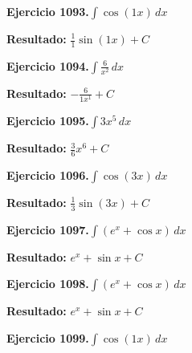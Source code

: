\documentclass[10pt,a4paper]{article}
\begin{document}
\newpage
\begin{ejbox}
\textbf{Ejercicio 1093.}\quad $\int \cos(1x)\,dx$
\end{ejbox}

\begin{solbox}
\textbf{Resultado:} \(\displaystyle \frac{1}{1}\sin(1x) + C\)
\end{solbox}

\begin{ejbox}
\textbf{Ejercicio 1094.}\quad $\int \frac{6}{x^{2}}\,dx$
\end{ejbox}

\begin{solbox}
\textbf{Resultado:} \(\displaystyle -\frac{6}{1x^{1}} + C\)
\end{solbox}

\begin{ejbox}
\textbf{Ejercicio 1095.}\quad $\int 3x^{5}\,dx$
\end{ejbox}

\begin{solbox}
\textbf{Resultado:} \(\displaystyle \frac{3}{6}x^{6} + C\)
\end{solbox}

\newpage
\begin{ejbox}
\textbf{Ejercicio 1096.}\quad $\int \cos(3x)\,dx$
\end{ejbox}

\begin{solbox}
\textbf{Resultado:} \(\displaystyle \frac{1}{3}\sin(3x) + C\)
\end{solbox}

\begin{ejbox}
\textbf{Ejercicio 1097.}\quad $\int (e^x + \cos x)\,dx$
\end{ejbox}

\begin{solbox}
\textbf{Resultado:} \(\displaystyle e^x + \sin x + C\)
\end{solbox}

\begin{ejbox}
\textbf{Ejercicio 1098.}\quad $\int (e^x + \cos x)\,dx$
\end{ejbox}

\begin{solbox}
\textbf{Resultado:} \(\displaystyle e^x + \sin x + C\)
\end{solbox}

\newpage
\begin{ejbox}
\textbf{Ejercicio 1099.}\quad $\int \cos(1x)\,dx$
\end{ejbox}
\end{document}
